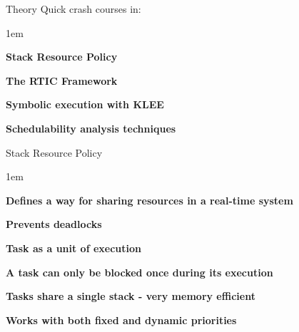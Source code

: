 \begin{frame}{Theory}
    Quick crash courses in:
    \vspace{1em}
    \begin{itemize-size}{1em}
        \item \textbf{Stack Resource Policy}
        \item \textbf{The RTIC Framework}
        \item \textbf{Symbolic execution with KLEE}
        \item \textbf{Schedulability analysis techniques}
    \end{itemize-size}
\end{frame}

\begin{frame}{Stack Resource Policy}
    \begin{itemize-size}{1em}
        \item \textbf{Defines a way for sharing resources in a real-time system}
        \item \textbf{Prevents deadlocks}
        \item \textbf{Task as a unit of execution}
        \item \textbf{A task can only be blocked once during its execution}
        \item \textbf{Tasks share a single stack - very memory efficient}
        \item \textbf{Works with both fixed and dynamic priorities}
    \end{itemize-size}
\end{frame}

